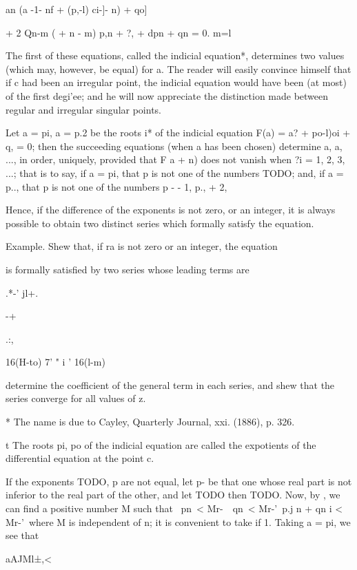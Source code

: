 an (a -1- nf + (p,-l) ci-]- n) + qo]

+ 2 Qn-m ( + n - m) p,n + ?, + dpn + qn = 0. m=l

The first of these equations, called the indicial equation*,
determines two values (which may, however, be equal) for a. The reader
will easily convince himself that if c had been an irregular point,
the indicial equation would have been (at most) of the first degi'ee;
and he will now appreciate the distinction made between regular and
irregular singular points.

Let a = pi, a = p.2 be the roots i* of the indicial equation F(a) = a?
+ po-l)oi + q, = 0; then the succeeding equations (when a has been
chosen) determine a, a, ..., in order, uniquely, provided that F a +
n) does not vanish when ?i = 1, 2, 3, ...; that is to say, if a = pi,
that p is not one of the numbers TODO; and, if a =
p.., that p is not one of the numbers p - - 1, p., + 2,

Hence, if the difference of the exponents is not zero, or an integer,
it is always possible to obtain two distinct series which formally
satisfy the equation.

Example. Shew that, if ra is not zero or an integer, the equation

is formally satisfied by two series whose leading terms are

.*-' jl+.

-+

.:,

16(H-to) 7' " i ' 16(l-m)

determine the coefficient of the general term in each series, and shew
that the series converge for all values of z.

* The name is due to Cayley, Quarterly Journal, xxi. (1886), p. 326.

t The roots pi, po of the indicial equation are called the expotients
of the differential equation at the point c.

%
%


If the exponents TODO, p are not equal, let p- be that one whose real
part is not inferior to the real part of the other, and let
TODO
then
TODO.
Now, by , we can find a positive number M
such that \ pn\ < Mr-\ \ qn\ < Mr-'\ p.j n + qn i < Mr-'\ where M is
independent of n; it is convenient to take if 1. Taking a = pi, we
see that

aAJMl±,<


